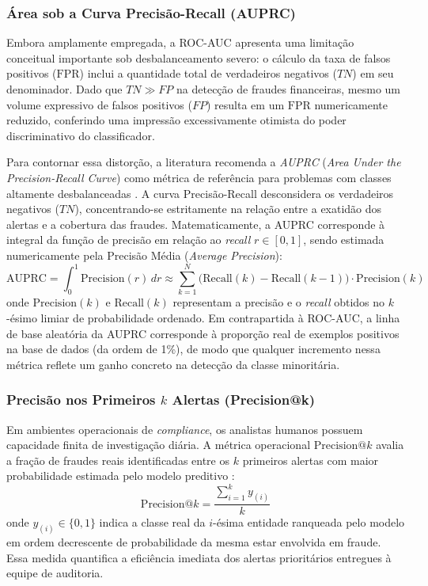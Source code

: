 \documentclass[a4paper,12pt,oneside,onecolumn,final,fleqn]{repUERJ}
\begin{document}
\subsubsection{Área sob a Curva Precisão-Recall (AUPRC)}
Embora amplamente empregada, a ROC-AUC apresenta uma limitação conceitual importante sob desbalanceamento severo: o cálculo da taxa de falsos positivos ($\mathrm{FPR}$) inclui a quantidade total de verdadeiros negativos ($TN$) em seu denominador. Dado que $TN \gg FP$ na detecção de fraudes financeiras, mesmo um volume expressivo de falsos positivos ($FP$) resulta em um $\mathrm{FPR}$ numericamente reduzido, conferindo uma impressão excessivamente otimista do poder discriminativo do classificador.

Para contornar essa distorção, a literatura recomenda a \textit{AUPRC} (\textit{Area Under the Precision-Recall Curve}) como métrica de referência para problemas com classes altamente desbalanceadas \cite{liu2022bond}. A curva Precisão-Recall desconsidera os verdadeiros negativos ($TN$), concentrando-se estritamente na relação entre a exatidão dos alertas e a cobertura das fraudes. Matematicamente, a AUPRC corresponde à integral da função de precisão em relação ao \textit{recall} $r \in [0, 1]$, sendo estimada numericamente pela Precisão Média (\textit{Average Precision}):
\begin{equation}
    \mathrm{AUPRC} = \int_{0}^{1} \mathrm{Precision}(r) \, dr \approx \sum_{k=1}^{N} \big( \mathrm{Recall}(k) - \mathrm{Recall}(k-1) \big) \cdot \mathrm{Precision}(k)
\end{equation}
onde $\mathrm{Precision}(k)$ e $\mathrm{Recall}(k)$ representam a precisão e o \textit{recall} obtidos no $k$-ésimo limiar de probabilidade ordenado. Em contrapartida à ROC-AUC, a linha de base aleatória da AUPRC corresponde à proporção real de exemplos positivos na base de dados (da ordem de 1\%), de modo que qualquer incremento nessa métrica reflete um ganho concreto na detecção da classe minoritária.

\subsubsection{Precisão nos Primeiros \texorpdfstring{$k$}{k} Alertas (Precision@k)}
Em ambientes operacionais de \textit{compliance}, os analistas humanos possuem capacidade finita de investigação diária. A métrica operacional $\mathrm{Precision@}k$ avalia a fração de fraudes reais identificadas entre os $k$ primeiros alertas com maior probabilidade estimada pelo modelo preditivo \cite{karim2024scalable}:
\begin{equation}
    \mathrm{Precision@}k = \frac{\sum_{i=1}^{k} y_{(i)}}{k}
\end{equation}
onde $y_{(i)} \in \{0, 1\}$ indica a classe real da $i$-ésima entidade ranqueada pelo modelo em ordem decrescente de probabilidade da mesma estar envolvida em fraude. Essa medida quantifica a eficiência imediata dos alertas prioritários entregues à equipe de auditoria.
\end{document}
